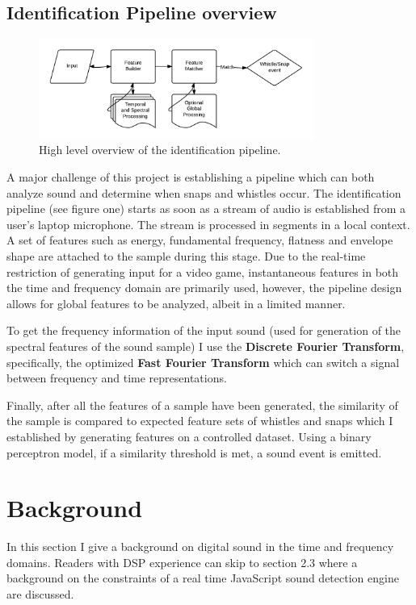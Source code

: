 \documentclass[DIV=calc, paper=a4, fontsize=11pt, twocolumn]{scrartcl}   %
\begin{document}
\subsection{Identification Pipeline overview}
\begin{figure}[h]
\centering
\includegraphics[width=90mm]{figures/HighLevelPipeline.png}
\caption{High level overview of the identification pipeline.}
\label{overflow}
\end{figure}
A major challenge of this project is establishing a pipeline which can both analyze sound and determine when snaps and whistles occur. The identification pipeline (see figure one) starts as soon as a stream of audio is established from a user's laptop microphone. The stream is processed in segments in a local context. A set of features such as energy, fundamental frequency, flatness and envelope shape are attached to the sample during this stage. Due to the real-time restriction of generating input for a video game, instantaneous features in both the time and frequency domain are primarily used, however, the pipeline design allows for global features to be analyzed, albeit in a limited manner.
\par To get the frequency information of the input sound (used for generation of the spectral features of the sound sample) I use the \textbf{Discrete Fourier Transform}, specifically, the optimized \textbf{Fast Fourier Transform}  which can switch a signal between frequency and time representations.
\par Finally, after all the features of a sample have been generated, the similarity of the sample is compared to expected feature sets of whistles and snaps which I established by generating features on a controlled dataset. Using a binary perceptron model, if a similarity threshold is met, a sound event is emitted.





\section{Background}
In this section I give a background on digital sound in the time and frequency domains. Readers with DSP experience can skip to section 2.3 where a background on the constraints of a real time JavaScript sound detection engine are discussed.
\end{document}
